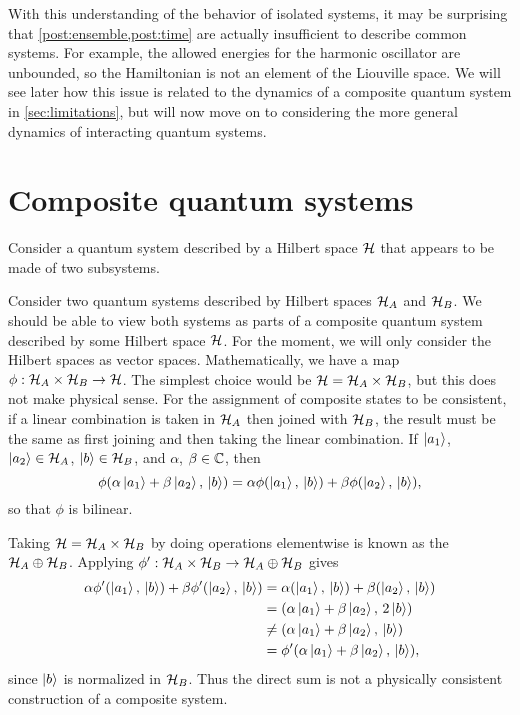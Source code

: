 \documentclass[../thesis.tex]{subfiles}
\begin{document}
With this understanding of the behavior of isolated systems, it may be
surprising that \cref{post:ensemble,post:time} are actually
insufficient to describe common systems. For example, the allowed energies for
the harmonic oscillator are unbounded, so the Hamiltonian is not an element of
the Liouville space. We will see later how this issue is related to the dynamics
of a composite quantum system in \cref{sec:limitations}, but will now move
on to considering the more general dynamics of interacting quantum systems.

\section{Composite quantum systems\label{sec:composite}}


Consider a quantum system described by a Hilbert space $\mathcal{H}$ that appears to
be made of two subsystems.

Consider two quantum systems described by Hilbert spaces $\mathcal{H}_A$ and
$\mathcal{H}_B$. We should be able to view both systems as parts of a composite
quantum system described by some Hilbert space $\mathcal{H}$. For the moment, we
will only consider the Hilbert spaces as vector spaces. Mathematically, we have
a map $\phi:\mathcal{H}_A \times \mathcal{H}_B \to \mathcal{H}$. The simplest choice would be
$\mathcal{H} = \mathcal{H}_A \times \mathcal{H}_B$, but this does not make physical sense. For
the assignment of composite states to be consistent, if a linear combination is
taken in $\mathcal{H}_A$ then joined with $\mathcal{H}_B$, the result must be the same as
first joining and then taking the linear combination. If $\ket{a_1}$, $\ket{a_2}
\in \mathcal{H}_A$, $\ket{b} \in \mathcal{H}_B$, and $\alpha$, $\beta \in \mathbb{C}$, then
\begin{equation}
  \phi\qty(\alpha\ket{a_1} + \beta\ket{a_2},\, \ket{b})
  = \alpha\phi\qty(\ket{a_1},\, \ket{b}) + \beta\phi\qty(\ket{a_2},\, \ket{b}),
  \label{eq:consistent-composite}
\end{equation}
so that $\phi$ is bilinear.

Taking $\mathcal{H} = \mathcal{H}_A \times \mathcal{H}_B$ by doing operations elementwise is
known as the  $\mathcal{H}_A \oplus \mathcal{H}_B$. Applying $\phi':\mathcal{H}_A
\times \mathcal{H}_B \to \mathcal{H}_A \oplus \mathcal{H}_B$ gives
\begin{align}
  \alpha\phi'\qty(\ket{a_1},\, \ket{b}) + \beta\phi'\qty(\ket{a_2},\, \ket{b})
  &= \alpha\qty(\ket{a_1},\, \ket{b}) + \beta\qty(\ket{a_2},\, \ket{b}) \\
  &= \qty(\alpha\ket{a_1} + \beta\ket{a_2},\, 2\ket{b}) \\
  &\ne \qty(\alpha\ket{a_1} + \beta\ket{a_2},\, \ket{b}) \\
  &= \phi'\qty(\alpha\ket{a_1} + \beta\ket{a_2},\, \ket{b}),
\end{align}
since $\ket{b}$ is normalized in $\mathcal{H}_B$. Thus the direct sum is not a
physically consistent construction of a composite system.
\end{document}

